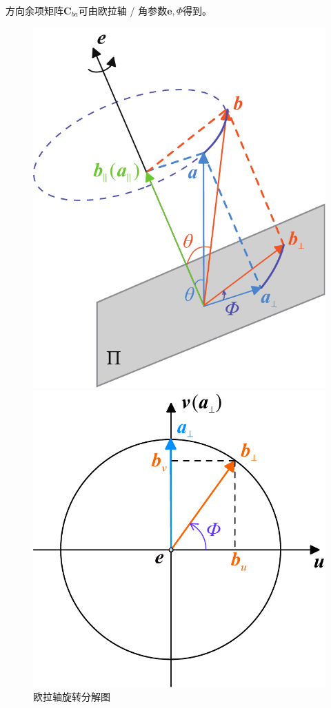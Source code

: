 方向余项矩阵$\bm{C}_{ba}$可由欧拉轴 / 角参数$\bm{e}, \varPhi$得到。
\begin{figure}[!htb]
	\begin{minipage}{0.31\linewidth}
		\centering
		\includegraphics[width=0.9\linewidth]{pic/欧拉轴}
		\vspace*{-1.2em}
		\caption{欧拉轴旋转分解图}
		\label{欧拉轴}
	\end{minipage}
	\begin{minipage}{0.33\linewidth}
		\centering
		\includegraphics[width=\linewidth]{pic/欧拉轴2}

\end{minipage}
\end{figure}
